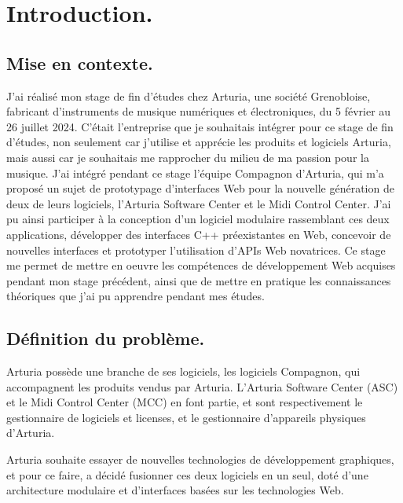 \documentclass[francais]{rapportPFE}  %
\begin{document}



     
     
     
\section{Introduction.}

\subsection{Mise en contexte.}
J'ai réalisé mon stage de fin d'études chez Arturia, une société Grenobloise, fabricant d'instruments de musique numériques et électroniques, du 5 février au 26 juillet 2024. C'était l'entreprise que je souhaitais intégrer pour ce stage de fin d'études, non seulement car j'utilise et apprécie les produits et logiciels Arturia, mais aussi car je souhaitais me rapprocher du milieu de ma passion pour la musique. 
J'ai intégré pendant ce stage l'équipe Compagnon d'Arturia, qui m'a proposé un sujet de prototypage d'interfaces Web pour la nouvelle génération de deux de leurs logiciels, l'Arturia Software Center et le Midi Control Center. J'ai pu ainsi participer à la conception d'un logiciel modulaire rassemblant ces deux applications, développer des interfaces C++ préexistantes en Web, concevoir de nouvelles interfaces et prototyper l'utilisation d'APIs Web novatrices. Ce stage me permet de mettre en oeuvre les compétences de développement Web acquises pendant mon stage précédent, ainsi que de mettre en pratique les connaissances théoriques que j'ai pu apprendre pendant mes études.
\subsection{Définition du problème.}

Arturia possède une branche de ses logiciels, les logiciels Compagnon, qui accompagnent les produits vendus par Arturia.
L'Arturia Software Center (ASC) et le Midi Control Center (MCC) en font partie, et sont respectivement le gestionnaire de logiciels et licenses, et le gestionnaire d'appareils physiques d'Arturia.

Arturia souhaite essayer de nouvelles technologies de développement graphiques, et pour ce faire, a décidé fusionner ces deux logiciels en un seul, doté d'une architecture modulaire et d'interfaces basées sur les technologies Web. 
\end{document}
